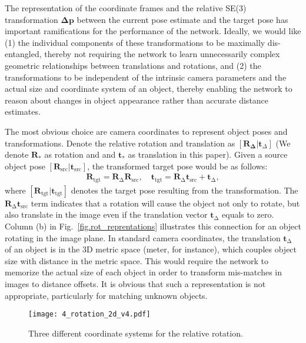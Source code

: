 \documentclass[twocolumn]{svjour3}
\newcommand{\yi}[1]{#1}
\begin{document}

The representation of the coordinate frames and the relative SE(3) transformation $\mathbf{\Delta p}$ between the current pose estimate and the target pose has important ramifications for the performance of the network.  Ideally, we would like (1) the individual components of these transformations to be maximally dis-entangled, thereby not requiring the network to learn unnecessarily complex geometric relationships between translations and rotations, and (2) the transformations to be independent of the intrinsic camera parameters and the actual size and coordinate system of an object, thereby enabling the network to reason about changes in object appearance rather than accurate distance estimates. 

The most obvious choice are camera coordinates to represent object poses and transformations.  Denote the relative rotation and translation as $[\mathbf{R_\Delta}|\mathbf{t}_\Delta]$ \yi{(We denote $\mathbf{R}_*$ as rotation and and $\mathbf{t}_*$ as translation in this paper)}.  Given a source object pose $[\mathbf{R}_{\text{src}}|\mathbf{t}_{\text{src}}]$, the transformed target pose would be as follows:
\begin{equation}
\begin{split}
\mathbf{R}_\text{tgt} = \mathbf{R}_\mathrm{\Delta} \mathbf{R}_\text{src}, \quad
\mathbf{t}_\text{tgt} = \mathbf{R}_\mathrm{\Delta} \mathbf{t}_\text{src}+\mathbf{t}_\mathrm{\Delta},
\end{split}
\label{eq.naive_transform}
\end{equation}
where $[\mathbf{R}_{\text{tgt}}|\mathbf{t}_{\text{tgt}}]$ denotes the target pose resulting from the transformation.
The $\mathbf{R}_\mathrm{\Delta} \mathbf{t}_\text{src}$ term indicates that a rotation will cause the object not only to rotate, but also translate in the image even if the translation vector $\mathbf{t}_\mathrm{\Delta}$ equals to zero. 
Column (b) in Fig.~\ref{fig.rot_reprentations} illustrates this connection for an object rotating in the image plane.  
In standard camera coordinates, the translation $\mathbf{t}_\mathrm{\Delta}$ of an object is in the 3D metric space (meter, for instance), which couples object size with distance in the metric space.  This would require the network to memorize the actual size of each object in order to transform mis-matches in images to distance offsets. It is obvious that such a representation is not appropriate, particularly for matching unknown objects. 
\begin{figure*}[t]
	\centering
	\texttt{[image: 4\_rotation\_2d\_v4.pdf]}
\caption{Three different coordinate systems for the relative rotation.}%
\label{fig.different_reprentation}
\end{figure*}
\fi
\end{document}

